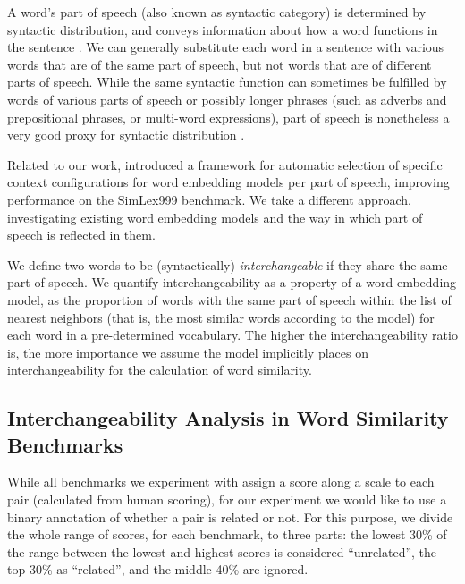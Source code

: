 \documentclass[11pt,a4paper]{article}
\begin{document}
    A word's part of speech (also known as syntactic category)
    is determined by syntactic distribution, and
    conveys information about how a word functions in the sentence \cite{carnie2002syntax}.
    We can generally substitute each word in a sentence
    with various words that are of the same part of speech,
    but not words that are of different parts of speech.
    While the same syntactic function can sometimes be fulfilled by words of
    various parts of speech or possibly longer phrases (such as adverbs and
    prepositional phrases, or multi-word expressions),
    part of speech is nonetheless a very good proxy for syntactic distribution
    \cite{W04-2404}.
    
    Related to our work,
     introduced a framework for automatic selection of
    specific context configurations for word embedding models
    per part of speech, improving
    performance on the SimLex999 benchmark.
    We take a different approach, investigating existing word embedding
    models and the way in which part of speech is reflected in them.
    
    We define two words to be (syntactically) \textit{interchangeable}
    if they share the same part of speech.
    We quantify interchangeability
    as a property of a word embedding model,
    as the proportion of words with the same part of speech
    within the list of nearest neighbors
    (that is, the most similar words according to the model)
    for each word in a pre-determined vocabulary.
    The higher the interchangeability ratio is,
    the more importance we assume the model implicitly places on interchangeability
    for the calculation of word similarity.
    
    \subsection{Interchangeability Analysis in Word Similarity Benchmarks}\label{sec:benchmark_exp}
    
    While all benchmarks we experiment with assign a score along a scale to each pair
    (calculated from human scoring), for our experiment we would like to use
    a binary annotation of whether a pair is related or not.
    For this purpose, we divide the whole range of scores,
    for each benchmark, to three parts:
    the lowest 30\% of the range between the lowest and highest scores
    is considered ``unrelated'', the top 30\% as ``related'',
    and the middle 40\% are ignored.
    
\end{document}
